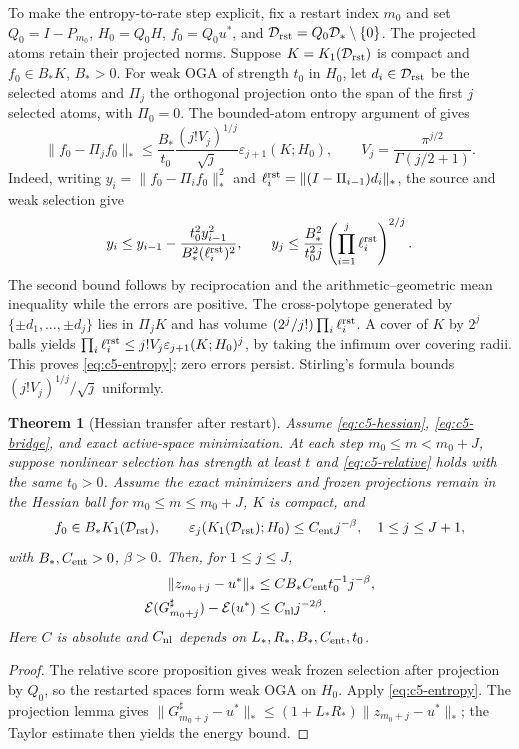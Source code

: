 \documentclass[11pt]{article}
\newtheorem{theorem}{Theorem}[section]
\theoremstyle{remark}\newtheorem{remark}[theorem]{Remark}
\begin{document}
To make the entropy-to-rate step explicit, fix a restart index $m_0$ and set
$Q_0=I-P_{m_0}$, $H_0=Q_0H$, $f_0=Q_0u^*$, and
$\mathcal D_{\rm rst}=Q_0\mathcal D_*\setminus\{0\}$.  The projected atoms retain their projected norms.
Suppose $K=K_1(\mathcal D_{\rm rst})$ is compact and $f_0\in B_*K$, $B_*>0$.
For weak OGA of strength $t_0$ in $H_0$, let
$d_i\in\mathcal D_{\rm rst}$ be the selected atoms and
$\Pi_j$ the orthogonal projection onto the span of the first
$j$ selected atoms, with $\Pi_0=0$.
The bounded-atom entropy argument of
\cite[Theorem~4.2]{LiSiegelEntropy2024} gives
\begin{equation}
 \|f_0-\Pi_jf_0\|_*
 \leq \frac{B_*}{t_0}\frac{(j!V_j)^{1/j}}{\sqrt j}
 \varepsilon_{j+1}(K;H_0),
 \qquad V_j=\frac{\pi^{j/2}}{\Gamma(j/2+1)}.
 \label{eq:c5-entropy}
\end{equation}
Indeed, writing $y_i=\|f_0-\Pi_if_0\|_*^2$ and
$\ell_i^{\rm rst}=\|(I-\Pi_{i-1})d_i\|_*$, the source and weak selection give
\[
 y_i\le y_{i-1}-\frac{t_0^2y_{i-1}^2}{B_*^2(\ell_i^{\rm rst})^2},
 \qquad
 y_j\le\frac{B_*^2}{t_0^2j}
       \left(\prod_{i=1}^j\ell_i^{\rm rst}\right)^{2/j}.
\]
The second bound follows by reciprocation and the arithmetic--geometric mean
inequality while the errors are positive. The cross-polytope generated by
$\{\pm d_1,\ldots,\pm d_j\}$ lies in $\Pi_jK$ and has volume
$(2^j/j!)\prod_i\ell_i^{\rm rst}$.
A cover of $K$ by $2^j$ balls yields
$\prod_i\ell_i^{\rm rst}\le j!V_j\varepsilon_{j+1}(K;H_0)^j$,
by taking the infimum over covering radii. This proves \eqref{eq:c5-entropy};
zero errors persist. Stirling's formula bounds $(j!V_j)^{1/j}/\sqrt j$
uniformly.

\begin{theorem}[Hessian transfer after restart]
\label{thm:c5-hessian}
Assume \eqref{eq:c5-hessian}, \eqref{eq:c5-bridge}, and exact active-space
minimization. At each step $m_0\le m<m_0+J$, suppose nonlinear selection has
strength at least $t$ and \eqref{eq:c5-relative} holds with the same $t_0>0$.
Assume the exact minimizers and frozen projections remain in the Hessian ball
for $m_0\le m\le m_0+J$, $K$ is compact, and
\[
 f_0\in B_*K_1(\mathcal D_{\rm rst}),\qquad
 \varepsilon_j(K_1(\mathcal D_{\rm rst});H_0)\le C_{\rm ent}j^{-\beta},
 \quad 1\le j\le J+1,
\]
with $B_*,C_{\rm ent}>0$, $\beta>0$. Then, for $1\le j\le J$,
\begin{align}
 \|z_{m_0+j}-u^*\|_*&\le C B_*C_{\rm ent}t_0^{-1}j^{-\beta},\\
 \mathcal E(G_{m_0+j}^\sharp)-\mathcal E(u^*)&\le C_{\rm nl}j^{-2\beta}.
 \label{eq:c5-hessian-rate}
\end{align}
Here \(C\) is absolute and \(C_{\rm nl}\) depends on \(L_*,R_*,B_*,C_{\rm ent},t_0\).
\end{theorem}
\begin{proof}
The relative score proposition gives weak frozen selection after projection by
$Q_0$, so the restarted spaces form weak OGA on $H_0$.  Apply
\eqref{eq:c5-entropy}.  The projection lemma gives
$\|G_{m_0+j}^\sharp-u^*\|_*\le(1+L_*R_*)\|z_{m_0+j}-u^*\|_*$;
the Taylor estimate then yields the energy bound.
\end{proof}
\end{document}
